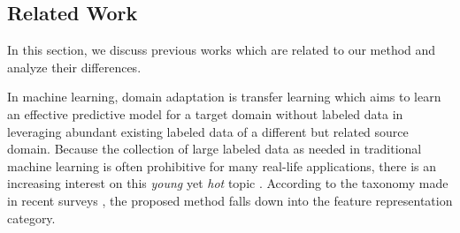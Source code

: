 \documentclass[10pt,twocolumn,letterpaper]{article}
\begin{document}
\begin{CJK*}{UTF8}{gkai}
\vspace{-5pt}




\section{Related Work}

In this section, we discuss previous works which are related to our method and analyze their differences. 

In machine learning,  domain adaptation is transfer learning which aims to learn an effective predictive  model for a target domain without labeled data in leveraging abundant existing labeled data of a different but related source domain.   Because the collection of large labeled data as needed in traditional machine learning is often prohibitive for many real-life applications, there is an increasing interest on this \emph{young} yet \emph{hot} topic \cite{pan2010survey}\cite{weiss2016survey}.    According to the taxonomy made in recent surveys \cite{pan2010survey}\cite{weiss2016survey} \cite{long2013transfer}, the proposed method falls down into the feature representation category.



\end{CJK*}
\end{document}
